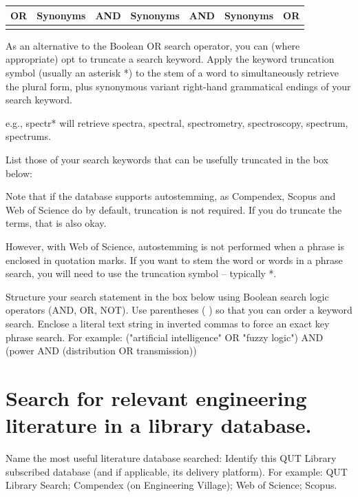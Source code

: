 \documentclass[12pt, a4paper]{article}
\begin{document}
\begin{table}[h]
\centering
\renewcommand{\arraystretch}{1.5}
\begin{tabular}{|c|p{3.5cm}|c|p{3.5cm}|c|p{3.5cm}|c|}
\hline
OR & \centering Synonyms & AND & \centering Synonyms & AND & \centering Synonyms & OR \tabularnewline
\hline
 & & & & & & \\[1.5cm]
\hline
\end{tabular}
\end{table}

As an alternative to the Boolean OR search operator, you can (where appropriate) opt to truncate a search keyword. Apply the keyword truncation symbol (usually an asterisk *) to the stem of a word to simultaneously retrieve the plural form, plus synonymous variant right-hand grammatical endings of your search keyword.

e.g., spectr* will retrieve spectra, spectral, spectrometry, spectroscopy, spectrum, spectrums.

List those of your search keywords that can be usefully truncated in the box below:

Note that if the database supports autostemming, as Compendex, Scopus and Web of Science do by default, truncation is not required. If you do truncate the terms, that is also okay.

However, with Web of Science, autostemming is not performed when a phrase is enclosed in quotation marks. If you want to stem the word or words in a phrase search, you will need to use the truncation symbol – typically *.

\vspace{1cm}
Structure your search statement in the box below using Boolean search logic operators (AND, OR, NOT). Use parentheses ( ) so that you can order a keyword search. Enclose a literal text string in inverted commas to force an exact key phrase search. For example: ("artificial intelligence" OR "fuzzy logic") AND (power AND (distribution OR transmission))
\vspace{2cm}

\section*{Search for relevant engineering literature in a library database.}
Name the most useful literature database searched: Identify this QUT Library subscribed database (and if applicable, its delivery platform). For example: QUT Library Search; Compendex (on Engineering Village); Web of Science; Scopus.
\end{document}
